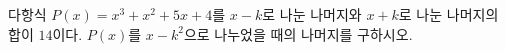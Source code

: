 다항식 $P(x)=x^3+x^2+5x+4$를 $x-k$로 나눈 나머지와 $x+k$로 나눈 나머지의 합이 $14$이다. $P(x)$를 $x-k^2$으로 나누었을 때의 나머지를 구하시오. 
